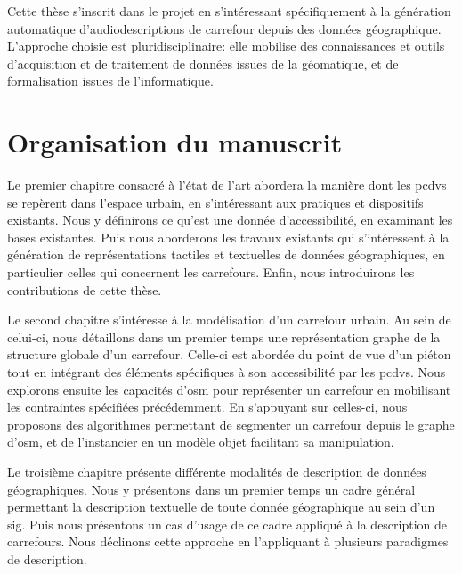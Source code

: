 
\newpar{}

Cette thèse s'inscrit dans le projet en s'intéressant spécifiquement à la génération automatique d'audiodescriptions de carrefour depuis des données géographique. L'approche choisie est pluridisciplinaire: elle mobilise des connaissances et outils d'acquisition et de traitement de données issues de la géomatique, et de formalisation issues de l'informatique.

\section*{Organisation du manuscrit}

Le premier chapitre consacré à l'état de l'art abordera la manière dont les \glspl{pcdv} se repèrent dans l'espace urbain, en s'intéressant aux pratiques et dispositifs existants. Nous y définirons ce qu'est une donnée d'accessibilité, en examinant les bases existantes. Puis nous aborderons les travaux existants qui s'intéressent à la génération de représentations tactiles et textuelles de données géographiques, en particulier celles qui concernent les carrefours. Enfin, nous introduirons les contributions de cette thèse.

\newpar{}

Le second chapitre s'intéresse à la modélisation d'un carrefour urbain. Au sein de celui-ci, nous détaillons dans un premier temps une représentation graphe de la structure globale d'un carrefour. Celle-ci est abordée du point de vue d'un piéton tout en intégrant des éléments spécifiques à son accessibilité par les \glspl{pcdv}. Nous explorons ensuite les capacités d'\gls{osm} pour représenter un carrefour en mobilisant les contraintes spécifiées précédemment. En s'appuyant sur celles-ci, nous proposons des algorithmes permettant de segmenter un carrefour depuis le graphe d'\gls{osm}, et de l'instancier en un modèle objet facilitant sa manipulation.

\newpar{}

Le troisième chapitre présente différente modalités de description de données géographiques. Nous y présentons dans un premier temps un cadre général permettant la description textuelle de toute donnée géographique au sein d'un \gls{sig}. Puis nous présentons un cas d'usage de ce cadre appliqué à la description de carrefours. Nous déclinons cette approche en l'appliquant à plusieurs paradigmes de description.

